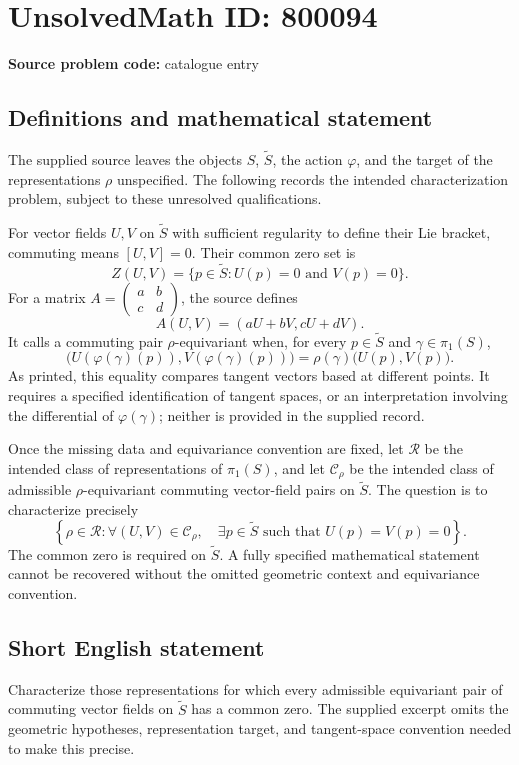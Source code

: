\documentclass[11pt]{article}
\begin{document}
\section*{UnsolvedMath ID: 800094}
\textbf{Source problem code:} catalogue entry
\subsection{Definitions and mathematical statement}
The supplied source leaves the objects \(S\), \(\widetilde S\), the action \(\varphi\), and the target of the representations \(\rho\) unspecified. The following records the intended characterization problem, subject to these unresolved qualifications.

For vector fields \(U,V\) on \(\widetilde S\) with sufficient regularity to define their Lie bracket, commuting means \([U,V]=0\). Their common zero set is
\[
Z(U,V)=\{p\in\widetilde S:U(p)=0\text{ and }V(p)=0\}.
\]
For a matrix \(A=\begin{pmatrix}a&b\\c&d\end{pmatrix}\), the source defines
\[
A(U,V)=(aU+bV,cU+dV).
\]
It calls a commuting pair \(\rho\)-equivariant when, for every \(p\in\widetilde S\) and \(\gamma\in\pi_1(S)\),
\[
\bigl(U(\varphi(\gamma)(p)),V(\varphi(\gamma)(p))\bigr)
=\rho(\gamma)\bigl(U(p),V(p)\bigr).
\]
As printed, this equality compares tangent vectors based at different points. It requires a specified identification of tangent spaces, or an interpretation involving the differential of \(\varphi(\gamma)\); neither is provided in the supplied record.

Once the missing data and equivariance convention are fixed, let \(\mathcal R\) be the intended class of representations of \(\pi_1(S)\), and let \(\mathcal C_\rho\) be the intended class of admissible \(\rho\)-equivariant commuting vector-field pairs on \(\widetilde S\). The question is to characterize precisely
\[
\left\{\rho\in\mathcal R:
\forall (U,V)\in\mathcal C_\rho,\quad
\exists p\in\widetilde S\text{ such that }U(p)=V(p)=0
\right\}.
\]
The common zero is required on \(\widetilde S\). A fully specified mathematical statement cannot be recovered without the omitted geometric context and equivariance convention.
\subsection{Short English statement}
Characterize those representations for which every admissible equivariant pair of commuting vector fields on \(\widetilde S\) has a common zero. The supplied excerpt omits the geometric hypotheses, representation target, and tangent-space convention needed to make this precise.
\end{document}
